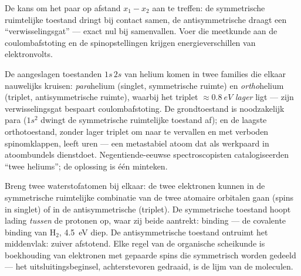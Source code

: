 \begin{omfigure}

{\small De kans om het paar op afstand $x_1 - x_2$ aan te treffen: de
symmetrische ruimtelijke toestand dringt bij contact samen, de
antisymmetrische draagt een ``verwisselingsgat'' --- exact nul bij
samenvallen. Voer die meetkunde aan de coulombafstoting en de
spinopstellingen krijgen energieverschillen van elektronvolts.}
\end{omfigure}

\begin{example}\label{ex:b3:identical-particles:helium}
De aangeslagen toestanden $1s\,2s$ van helium komen in twee families die
elkaar nauwelijks kruisen: \emph{para}helium (singlet, symmetrische
ruimte) en \emph{ortho}helium (triplet, antisymmetrische ruimte), waarbij
het triplet $\approx\qty{0.8}{eV}$ \emph{lager} ligt --- zijn
verwisselingsgat bespaart coulombafstoting. De grondtoestand is
noodzakelijk para ($1s^2$ dwingt de symmetrische ruimtelijke toestand af);
en de laagste orthotoestand, zonder lager triplet om naar te vervallen en
met verboden spinomklappen, leeft uren --- een metastabiel atoom dat als
werkpaard in atoombundels dienstdoet. Negentiende-eeuwse spectroscopisten
catalogiseerden ``twee heliums''; de oplossing is één minteken.
\end{example}

\begin{example}\label{ex:b3:identical-particles:bond}
Breng twee waterstofatomen bij elkaar: de twee elektronen kunnen in de
symmetrische ruimtelijke combinatie van de twee atomaire orbitalen gaan
(spins in singlet) of in de antisymmetrische (triplet). De symmetrische
toestand hoopt lading \emph{tussen} de protonen op, waar zij beide
aantrekt: binding --- de covalente binding van H$_2$, \qty{4.5}{eV} diep.
De antisymmetrische toestand ontruimt het middenvlak: zuiver afstotend.
Elke regel van de organische scheikunde is boekhouding van elektronen met
gepaarde spins die symmetrisch worden gedeeld --- het uitsluitingsbeginsel,
achterstevoren gedraaid, is de lijm van de moleculen.
\end{example}

